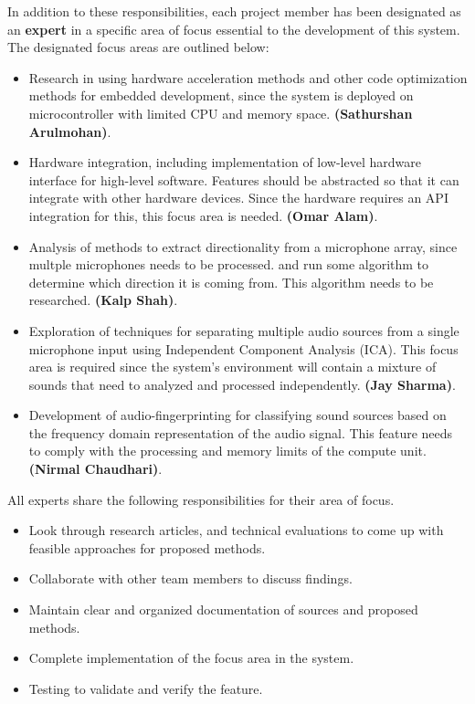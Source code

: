 \documentclass[12pt]{article}
\theoremstyle{definition}
\begin{document}
In addition to these responsibilities, each project member
has been designated as an \textbf{expert} in a specific area of focus essential
to the development of this system. The designated focus areas are outlined
below:

\begin{itemize}
    \item Research in using hardware acceleration methods and other code
    optimization methods for embedded development, since the system is deployed
    on microcontroller with limited CPU and memory space. \textbf{(Sathurshan
    Arulmohan)}.
    \item Hardware integration, including implementation of low-level hardware
     interface for high-level software. Features should be abstracted so that it
     can integrate with other hardware devices. Since the hardware requires an
     API integration for this, this focus area is needed. \textbf{(Omar Alam)}.
    \item Analysis of methods to extract directionality from a microphone array,
     since multple microphones needs to be processed. and run some algorithm to
     determine which direction it is coming from. This algorithm needs to be
     researched. \textbf{(Kalp Shah)}.
    \item Exploration of techniques for separating multiple audio sources from a
    single microphone input using Independent Component Analysis (ICA). This
    focus area is required since the system's environment will contain a mixture
    of sounds that need to analyzed and processed independently. \textbf{(Jay
    Sharma)}.
    \item Development of audio-fingerprinting for classifying sound sources
    based on the frequency domain representation of the audio signal. This
    feature needs to comply with the processing and memory limits of the compute
    unit.\textbf{(Nirmal Chaudhari)}.
\end{itemize}

\noindent
All experts share the following responsibilities for their area of focus. 

\begin{itemize}
  \item Look through research articles, and technical evaluations to come up
  with feasible approaches for proposed methods. 
  \item Collaborate with other team members to discuss findings. 
  \item Maintain clear and organized documentation of sources and proposed
  methods. 
  \item Complete implementation of the focus area in the system.
  \item Testing to validate and verify the feature.
\end{itemize}
\end{document}
